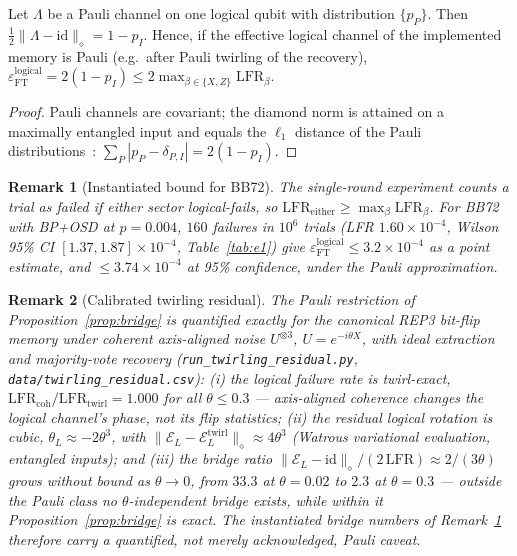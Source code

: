 \documentclass[11pt,a4paper]{article}
\newtheorem{remark}{Remark}
\begin{document}
\begin{proposition}\label{prop:bridge}
Let $\Lambda$ be a Pauli channel on one logical qubit with distribution
$\{p_P\}$. Then $\tfrac12\|\Lambda-\mathrm{id}\|_\diamond=1-p_I$.
Hence, if the effective logical channel of the implemented memory is
Pauli (e.g.\ after Pauli twirling of the recovery),
$\varepsilon_{\mathrm{FT}}^{\mathrm{logical}}=2(1-p_I)\le
2\max_{\beta\in\{X,Z\}}\mathrm{LFR}_\beta$.
\end{proposition}
\begin{proof}
Pauli channels are covariant; the diamond norm is attained on a
maximally entangled input and equals the $\ell_1$ distance of the Pauli
distributions~\cite{Watrous2018}: $\sum_P|p_P-\delta_{P,I}|=2(1-p_I)$.
\end{proof}
\begin{remark}[Instantiated bound for BB72]\label{rem:bridge-number}
The single-round experiment counts a trial as failed if either sector
logical-fails, so $\mathrm{LFR}_{\mathrm{either}}\ge
\max_{\beta}\mathrm{LFR}_{\beta}$. For BB72 with BP+OSD at $p=0.004$,
$160$ failures in $10^{6}$ trials (LFR $1.60\times10^{-4}$, Wilson 95\%
CI $[1.37,1.87]\times10^{-4}$, Table~\ref{tab:e1}) give
$\varepsilon_{\mathrm{FT}}^{\mathrm{logical}}\le3.2\times10^{-4}$ as a
point estimate, and $\le3.74\times10^{-4}$ at 95\% confidence, under
the Pauli approximation.
\end{remark}

\begin{remark}[Calibrated twirling residual]\label{rem:twirl-num}
The Pauli restriction of Proposition~\ref{prop:bridge} is quantified
exactly for the canonical REP3 bit-flip memory under coherent
axis-aligned noise $U^{\otimes3}$, $U=e^{-i\theta X}$, with ideal
extraction and majority-vote recovery
(\texttt{run\_twirling\_residual.py}, \texttt{data/twirling\_residual.csv}):
(i) the logical failure rate is twirl-exact,
$\mathrm{LFR}_{\mathrm{coh}}/\mathrm{LFR}_{\mathrm{twirl}}=1.000$ for all
$\theta\le0.3$ --- axis-aligned coherence changes the logical channel's
phase, not its flip statistics; (ii) the residual logical rotation is
cubic, $\theta_L\approx-2\theta^{3}$, with
$\|\mathcal{E}_L-\mathcal{E}_L^{\mathrm{twirl}}\|_{\diamond}\approx
4\theta^{3}$ (Watrous variational evaluation, entangled inputs); and
(iii) the bridge ratio
$\|\mathcal{E}_L-\mathrm{id}\|_{\diamond}/(2\,\mathrm{LFR})\approx
2/(3\theta)$ grows without bound as $\theta\to0$, from $33.3$ at
$\theta=0.02$ to $2.3$ at $\theta=0.3$ --- outside the Pauli class no
$\theta$-independent bridge exists, while within it
Proposition~\ref{prop:bridge} is exact. The instantiated bridge numbers
of Remark~\ref{rem:bridge-number} therefore carry a quantified, not
merely acknowledged, Pauli caveat.
\end{remark}
\end{document}
